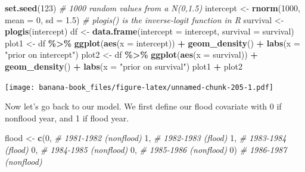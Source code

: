\documentclass[
  12pt,
]{krantz}
\newenvironment{Shaded}{\begin{snugshade}}{\end{snugshade}}
\newcommand{\AttributeTok}[1]{\textcolor[rgb]{0.13,0.29,0.53}{#1}}
\newcommand{\CommentTok}[1]{\textcolor[rgb]{0.56,0.35,0.01}{\textit{#1}}}
\newcommand{\DecValTok}[1]{\textcolor[rgb]{0.00,0.00,0.81}{#1}}
\newcommand{\FloatTok}[1]{\textcolor[rgb]{0.00,0.00,0.81}{#1}}
\newcommand{\FunctionTok}[1]{\textcolor[rgb]{0.13,0.29,0.53}{\textbf{#1}}}
\newcommand{\NormalTok}[1]{#1}
\newcommand{\OtherTok}[1]{\textcolor[rgb]{0.56,0.35,0.01}{#1}}
\newcommand{\SpecialCharTok}[1]{\textcolor[rgb]{0.81,0.36,0.00}{\textbf{#1}}}
\newcommand{\StringTok}[1]{\textcolor[rgb]{0.31,0.60,0.02}{#1}}
\begin{document}
\begin{Shaded}
\begin{Highlighting}[]
\FunctionTok{set.seed}\NormalTok{(}\DecValTok{123}\NormalTok{)}
\CommentTok{\# 1000 random values from a N(0,1.5)}
\NormalTok{intercept }\OtherTok{\textless{}{-}} \FunctionTok{rnorm}\NormalTok{(}\DecValTok{1000}\NormalTok{, }\AttributeTok{mean =} \DecValTok{0}\NormalTok{, }\AttributeTok{sd =} \FloatTok{1.5}\NormalTok{) }
\CommentTok{\# plogis() is the inverse{-}logit function in R}
\NormalTok{survival }\OtherTok{\textless{}{-}} \FunctionTok{plogis}\NormalTok{(intercept) }
\NormalTok{df }\OtherTok{\textless{}{-}} \FunctionTok{data.frame}\NormalTok{(}\AttributeTok{intercept =}\NormalTok{ intercept, }\AttributeTok{survival =}\NormalTok{ survival)}
\NormalTok{plot1 }\OtherTok{\textless{}{-}}\NormalTok{ df }\SpecialCharTok{\%\textgreater{}\%}
  \FunctionTok{ggplot}\NormalTok{(}\FunctionTok{aes}\NormalTok{(}\AttributeTok{x =}\NormalTok{ intercept)) }\SpecialCharTok{+}
  \FunctionTok{geom\_density}\NormalTok{() }\SpecialCharTok{+}
  \FunctionTok{labs}\NormalTok{(}\AttributeTok{x =} \StringTok{"prior on intercept"}\NormalTok{)}
\NormalTok{plot2 }\OtherTok{\textless{}{-}}\NormalTok{ df }\SpecialCharTok{\%\textgreater{}\%}
  \FunctionTok{ggplot}\NormalTok{(}\FunctionTok{aes}\NormalTok{(}\AttributeTok{x =}\NormalTok{ survival)) }\SpecialCharTok{+}
  \FunctionTok{geom\_density}\NormalTok{() }\SpecialCharTok{+}
  \FunctionTok{labs}\NormalTok{(}\AttributeTok{x =} \StringTok{"prior on survival"}\NormalTok{)}
\NormalTok{plot1 }\SpecialCharTok{+}\NormalTok{ plot2}
\end{Highlighting}
\end{Shaded}

\texttt{[image: banana-book\_files/figure-latex/unnamed-chunk-205-1.pdf]}

Now let's go back to our model. We first define our flood covariate with 0 if nonflood year, and 1 if flood year.

\begin{Shaded}
\begin{Highlighting}[]
\NormalTok{flood }\OtherTok{\textless{}{-}} \FunctionTok{c}\NormalTok{(}\DecValTok{0}\NormalTok{, }\CommentTok{\# 1981{-}1982 (nonflood)}
           \DecValTok{1}\NormalTok{, }\CommentTok{\# 1982{-}1983 (flood)}
           \DecValTok{1}\NormalTok{, }\CommentTok{\# 1983{-}1984 (flood)}
           \DecValTok{0}\NormalTok{, }\CommentTok{\# 1984{-}1985 (nonflood)}
           \DecValTok{0}\NormalTok{, }\CommentTok{\# 1985{-}1986 (nonflood)}
           \DecValTok{0}\NormalTok{) }\CommentTok{\# 1986{-}1987 (nonflood)}
\end{Highlighting}
\end{Shaded}
\end{document}
